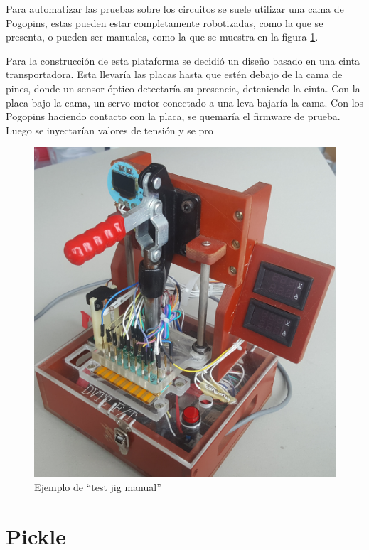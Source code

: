 \documentclass[12pt,letterpaper]{article}     %
\begin{document}
Para automatizar las pruebas sobre los circuitos se suele utilizar una cama de Pogopins, 
estas pueden estar completamente robotizadas, como la que se presenta, o pueden ser manuales,
como la que se muestra en la figura \ref{fig:pogojig}.

Para la construcción de esta plataforma se decidió un diseño basado en una cinta transportadora.
Esta llevaría las placas hasta que estén debajo de la cama de pines, donde un sensor óptico detectaría 
su presencia, deteniendo la cinta. Con la placa bajo la cama, un servo motor conectado a una leva 
bajaría la cama. Con los Pogopins haciendo contacto con la placa, se quemaría el firmware de prueba.
Luego se inyectarían valores de tensión y se pro

\begin{figure}[!ht]
\centering
\includegraphics[scale=0.1]{imagenes/pogojig.jpg}
\caption{Ejemplo de ``test jig manual''}
\label{fig:pogojig}
\end{figure}

\section{Pickle}
\end{document}
